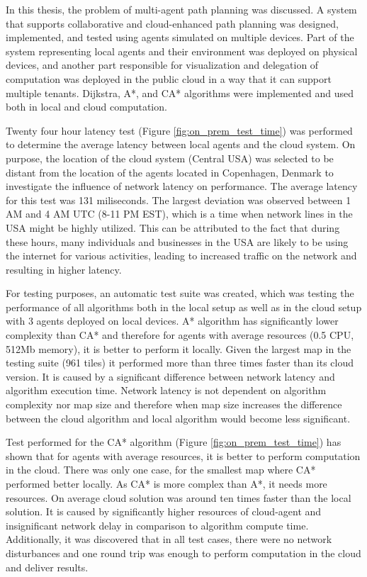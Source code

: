 In this thesis, the problem of multi-agent path planning was discussed. A system that supports collaborative and cloud-enhanced path planning was designed, implemented, and tested using agents simulated on multiple devices. Part of the system representing local agents and their environment was deployed on physical devices, and another part responsible for visualization and delegation of computation was deployed in the public cloud in a way that it can support multiple tenants. Dijkstra, A*, and CA* algorithms were implemented and used both in local and cloud computation.

Twenty four hour latency test (Figure \ref{fig:on_prem_test_time}) was performed to determine the average latency between local agents and the cloud system. On purpose, the location of the cloud system (Central USA) was selected to be distant from the location of the agents located in Copenhagen, Denmark to investigate the influence of network latency on performance. The average latency for this test was 131 miliseconds. The largest deviation was observed between 1 AM and 4 AM UTC (8-11 PM EST), which is a time when network lines in the USA might be highly utilized. This can be attributed to the fact that during these hours, many individuals and businesses in the USA are likely to be using the internet for various activities, leading to increased traffic on the network and resulting in higher latency. 

For testing purposes, an automatic test suite was created, which was testing the performance of all algorithms both in the local setup as well as in the cloud setup with 3 agents deployed on local devices. A* algorithm has significantly lower complexity  than CA* and therefore for agents with average resources (0.5 CPU, 512Mb memory), it is better to perform it locally. Given the largest map in the testing suite (961 tiles) it performed more than three times faster than its cloud version. It is caused by a significant difference between network latency and algorithm execution time. Network latency is not dependent on algorithm complexity nor map size and therefore when map size increases the difference between the cloud algorithm and local algorithm would become less significant.

Test performed for the CA* algorithm (Figure \ref{fig:on_prem_test_time}) has shown that for agents with average resources, it is better to perform computation in the cloud. There was only one case, for the smallest map where CA* performed better locally. As CA* is more complex than A*, it needs more resources. On average cloud solution was around ten times faster than the local solution. It is caused by significantly higher resources of cloud-agent and insignificant network delay in comparison to algorithm compute time. Additionally, it was discovered that in all test cases, there were no network disturbances and one round trip was enough to perform computation in the cloud and deliver results.


